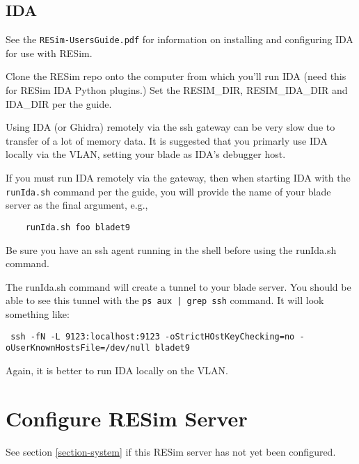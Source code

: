 \documentclass[titlepage]{article}
\begin{document}
\subsection{IDA}
See the {\tt RESim-UsersGuide.pdf} for information on installing and configuring IDA for use with 
RESim.  

Clone the RESim repo onto the computer from which you'll run IDA (need this for RESim
IDA Python plugins.)  Set the RESIM\_DIR, RESIM\_IDA\_DIR and IDA\_DIR per the guide.

Using IDA (or Ghidra) remotely via the ssh gateway can be very slow due to transfer of
a lot of memory data.  It is suggested that you
primarly use IDA locally via the VLAN, setting your blade as IDA's debugger host.

If you must run IDA remotely via the gateway, then when starting IDA with the {\tt runIda.sh} command per the guide, you will provide the
name of your blade server as the final argument, e.g.,
\begin{verbatim}
    runIda.sh foo bladet9
\end{verbatim}
\noindent Be sure you have an ssh agent running in the shell before using the runIda.sh command.

The runIda.sh command will create a tunnel to your blade server.  You should be able to see this tunnel
with the {\tt ps aux | grep ssh} command.  It will look something like:
\begin{verbatim}
 ssh -fN -L 9123:localhost:9123 -oStrictHOstKeyChecking=no -oUserKnownHostsFile=/dev/null bladet9
\end{verbatim}
\noindent Again, it is better to run IDA locally on the VLAN.

\section{Configure RESim Server}
See section \ref{section-system} if this RESim server has not yet been configured.
\end{document}
